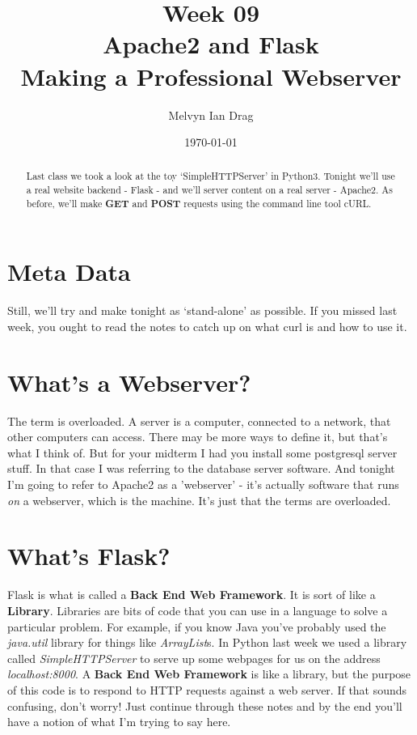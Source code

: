 \documentclass[10pt]{article}
\title{\textbf{Week 09} \\
\LARGE Apache2 and Flask \\
\Large Making a Professional Webserver}
\author{
	Melvyn Ian Drag
}
\date{\today}
\begin{document}
\maketitle

\begin{abstract}
Last class we took a look at the toy `SimpleHTTPServer' in Python3. Tonight we'll use a real website backend - Flask - and we'll server content on a real server - Apache2. As before, we'll make \textbf{GET} and \textbf{POST} requests using the command line tool cURL.
\end{abstract}

\section{Meta Data}

Still, we'll try and make tonight as `stand-alone' as possible. If you missed last week, you ought to read the notes to catch up on what curl is and how to use it.

\section{What's a Webserver?}
The term is overloaded. A server is a computer, connected to a network, that other computers can access. There may be more ways to define it, but that's what I think of. But for your midterm I had you install some postgresql server stuff. In that case I was referring to the database server software. And tonight I'm going to refer to Apache2 as a 'webserver' - it's actually software that runs \textit{on} a webserver, which is the machine. It's just that the terms are overloaded.

\section{What's Flask?}
Flask is what is called a \textbf{Back End Web Framework}. It is sort of like a
\textbf{Library}. Libraries are bits of code that you can use in a
language to solve a particular problem. For example, if you know Java you've
probably used the \textit{java.util} library for things like
\textit{ArrayList}s. In Python last week we used a library called
\textit{SimpleHTTPServer} to serve up some webpages for us on the address
\textit{localhost:8000}. A \textbf{Back End Web Framework} is like a library,
but the purpose of this code is to respond to HTTP requests against a web
server. If that sounds confusing, don't worry! Just continue through these notes
and by the end you'll have a notion of what I'm trying to say here.
\end{document}
